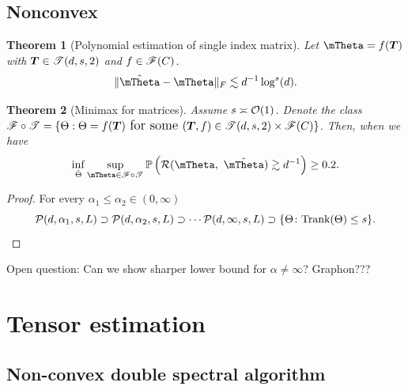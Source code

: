 \documentclass[final,12pt]{colt2020} %
\newtheorem{thm}{Theorem}[section]
\def\rank{\textup{Trank}}
\def\calif{\large\mathscr{F}}
\def\caliT{\large\mathscr{T}}
\begin{document}
\subsection{Nonconvex }
\begin{thm}[Polynomial estimation of single index matrix] Let $\mTheta=f(\mT)$ with $\mT\in\caliT(d,s,2)$ and $f\in\calif(C)$.
\[
\FnormSize{}{\hat \mTheta-\mTheta}\lesssim  d^{-1}\log^s(d).
\]
\end{thm}


\begin{thm}[Minimax for matrices] Assume $s\asymp \mathcal{O}(1)$. Denote the class $\calif \circ \caliT=\{\Theta: \Theta=f(\mT) \text{ for some }(\mT,f)\in\caliT(d,s,2)\times \calif(C)\}$. Then, when we have
\[
\inf_{\hat \Theta}\sup_{\mTheta\in \calif\circ \caliT}\mathbb{P}\left(\tR(\mTheta,\  \hat \mTheta)\gtrsim d^{-1}\right)\geq 0.2.
\]
\end{thm}
\begin{proof} For every $\alpha_1\leq \alpha_2\in(0,\infty)$
\[
\tP(d,\alpha_1,s,L)\supset \tP(d,\alpha_2,s,L)\supset  \cdots \tP(d,\infty,s,L) \supset \{\Theta\colon \rank(\Theta)\leq s\}.
\]
\end{proof}
Open question: Can we show sharper lower bound for $\alpha\neq\infty$? Graphon???

\section{Tensor estimation }


\subsection{Non-convex double spectral algorithm}
\end{document}
